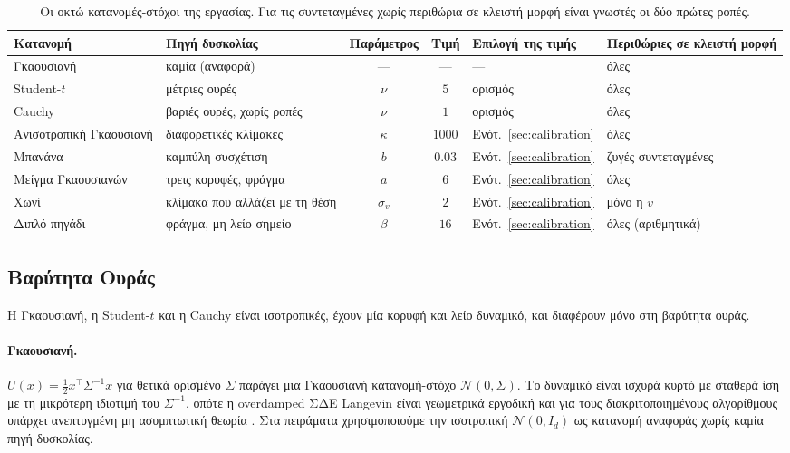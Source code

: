 \begin{table}[H]
\centering
\footnotesize
\begin{tabular}{p{2.4cm}p{3.1cm}ccp{1.7cm}p{2.5cm}}
\toprule
Κατανομή & Πηγή δυσκολίας & Παράμετρος & Τιμή & Επιλογή της τιμής & Περιθώριες σε κλειστή μορφή \\
\midrule
Γκαουσιανή & καμία (αναφορά) & --- & --- & --- & όλες \\
Student-$t$ & μέτριες ουρές & $\nu$ & $5$ & ορισμός & όλες \\
Cauchy & βαριές ουρές, χωρίς ροπές & $\nu$ & $1$ & ορισμός & όλες \\
Ανισοτροπική Γκαουσιανή & διαφορετικές κλίμακες & $\kappa$ & $1000$ & Ενότ.~\ref{sec:calibration} & όλες \\
Μπανάνα & καμπύλη συσχέτιση & $b$ & $0.03$ & Ενότ.~\ref{sec:calibration} & ζυγές συντεταγμένες \\
Μείγμα Γκαουσιανών & τρεις κορυφές, φράγμα & $a$ & $6$ & Ενότ.~\ref{sec:calibration} & όλες \\
Χωνί & κλίμακα που αλλάζει με τη θέση & $\sigma_v$ & $2$ & Ενότ.~\ref{sec:calibration} & μόνο η $v$ \\
Διπλό πηγάδι & φράγμα, μη λείο σημείο & $\beta$ & $16$ & Ενότ.~\ref{sec:calibration} & όλες (αριθμητικά) \\
\bottomrule
\end{tabular}
\caption{Οι οκτώ κατανομές-στόχοι της εργασίας. Για τις συντεταγμένες χωρίς
περιθώρια σε κλειστή μορφή είναι γνωστές οι δύο πρώτες ροπές.}
\label{tab:all-targets}
\end{table}

\subsection{Βαρύτητα Ουράς}
\label{sec:bg-tails}

Η Γκαουσιανή, η Student-$t$ και η Cauchy είναι ισοτροπικές, έχουν μία κορυφή και
λείο δυναμικό, και διαφέρουν μόνο στη βαρύτητα ουράς.

\paragraph{Γκαουσιανή.}
$U(x) = \tfrac12 x^\top \Sigma^{-1} x$ για θετικά ορισμένο $\Sigma$ παράγει μια
Γκαουσιανή κατανομή-στόχο $\mathcal{N}(0, \Sigma)$. Το δυναμικό είναι ισχυρά
κυρτό με σταθερά ίση με τη μικρότερη ιδιοτιμή του $\Sigma^{-1}$, οπότε η
overdamped ΣΔΕ Langevin είναι γεωμετρικά εργοδική και για τους διακριτοποιημένους
αλγορίθμους υπάρχει ανεπτυγμένη μη ασυμπτωτική θεωρία
\citep{dalalyan2017theoretical, durmus2017nonasymptotic}. Στα πειράματα χρησιμοποιούμε την ισοτροπική $\mathcal{N}(0, I_d)$ ως
κατανομή αναφοράς χωρίς καμία πηγή δυσκολίας.


